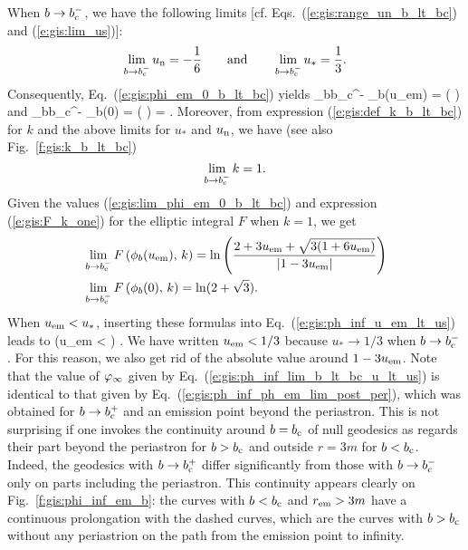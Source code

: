 When $b \to b_{\rm c}^-$, we have the following limits
[cf. Eqs.~(\ref{e:gis:range_un_b_lt_bc}) and (\ref{e:gis:lim_us})]:
\[
 \lim_{b\to b_{\rm c}^-} u_{\rm n} = - \frac{1}{6}
 \qquad\mbox{and}\qquad
 \lim_{b\to b_{\rm c}^-} u_* = \frac{1}{3} .
\]
Consequently, Eq.~(\ref{e:gis:phi_em_0_b_lt_bc}) yields
\be \label{e:gis:lim_phi_em_0_b_lt_bc}
   \lim_{b\to b_{\rm c}^-} \phi_b(u_{\rm em}) =
    \arccos\left(  \right)
   \quad\mbox{and}\quad
   \lim_{b\to b_{\rm c}^-} \phi_b(0) = \arccos\left(  \right) = .
\ee
Moreover, from expression (\ref{e:gis:def_k_b_lt_bc}) for $k$ and the above
limits for $u_*$ and $u_{\rm n}$, we have (see also Fig.~\ref{f:gis:k_b_lt_bc})
\[
    \lim_{b\to b_{\rm c}^-} k = 1 .
\]
Given the values (\ref{e:gis:lim_phi_em_0_b_lt_bc}) and expression
(\ref{e:gis:F_k_one}) for the elliptic integral $F$ when $k=1$, we get
\begin{subequations}
\label{e:gis:lim_F_em_0_b_lt_bc}
\begin{align}
    & \lim_{b\to b_{\rm c}^-} F \left( \phi_b(u_{\rm em}),\, k \right)  =
    \ln \left(
      \frac{2 + 3 u_{\rm em} + \sqrt{3(1+6 u_{\rm em})}}{|1 - 3 u_{\rm em}|}
      \right) \\
    & \lim_{b\to b_{\rm c}^-} F \left( \phi_b(0),\, k \right)  = \ln(2 + \sqrt{3}) .
\end{align}
\end{subequations}
When $u_{\rm em} < u_*$, inserting these formulas into
Eq.~(\ref{e:gis:ph_inf_u_em_lt_us}) leads to
\be \label{e:gis:ph_inf_lim_b_lt_bc_u_lt_us}
    \qquad \left(u_{\rm em} <  \right) .
\ee
We have written $u_{\rm em} < 1/3$ because $u_*\to 1/3$ when
$b\to b_{\rm c}^-$. For this reason, we also get rid of the absolute value
around $1 - 3  u_{\rm em}$.
Note that the value of $\varphi_\infty$ given by Eq.~(\ref{e:gis:ph_inf_lim_b_lt_bc_u_lt_us})
is identical to that given by Eq.~(\ref{e:gis:ph_inf_ph_em_lim_post_per}),
which was obtained for $b\to b_{\rm c}^+$ and an emission point beyond the
periastron. This is not surprising if one invokes the continuity around $b=b_{\rm c}$ of
null geodesics as regards their part beyond the periastron for $b > b_{\rm c}$
and outside $r = 3 m$ for $b < b_{\rm c}$. Indeed, the geodesics with $b \to b_{\rm c}^+$
differ significantly from those with $b \to b_{\rm c}^-$ only on
parts including the periastron. This continuity appears clearly on Fig.~\ref{f:gis:phi_inf_em_b}:
the curves with $b<b_{\rm c}$ and $r_{\rm em} > 3 m$ have a continuous prolongation
with the dashed curves, which are the curves with $b>b_{\rm c}$ without any periastrion
on the path from the emission point to infinity.

